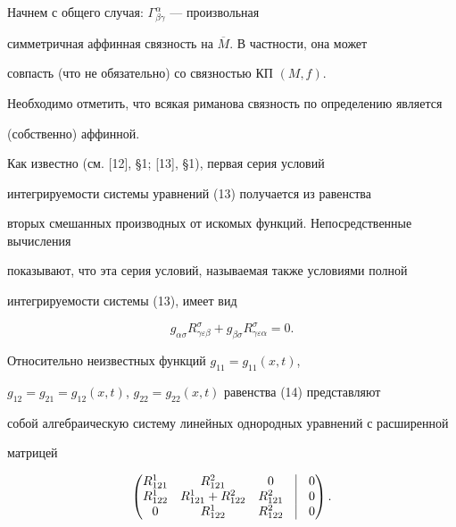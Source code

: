 Начнем с общего случая: $\Gamma^{\alpha}_{\beta \gamma} $ --- произвольная


симметричная аффинная связность на $\overline{M} $. В частности, она может


совпасть (что не обязательно) со связностью КП $(M,f) $.


Необходимо отметить, что всякая риманова связность по определению является


(собственно) аффинной.





Как известно (см. [12], \S 1; [13], \S 1), первая серия условий


интегрируемости системы уравнений (13) получается из равенства


вторых смешанных производных от искомых функций. Непосредственные вычисления


показывают, что эта серия условий, называемая также условиями полной


интегрируемости системы (13), имеет вид


\begin{equation}


g_{\alpha \sigma }R^{\sigma }_{\gamma \varepsilon \beta}


+ g_{\beta \sigma }R^{\sigma }_{\gamma \varepsilon \alpha}=0.


\end{equation}





Относительно неизвестных функций $g_{11}=g_{11}(x,t)$,


$g_{12}=g_{21}=g_{12}(x,t)$, $g_{22}=g_{22}(x,t)$ равенства (14) представляют


собой алгебраическую систему линейных однородных уравнений с расширенной


матрицей


\begin{equation}


\begin{pmatrix}


R^1_{121} & R^2_{121} & 0 & \vline & 0\\


R^1_{122} & R^1_{121}+ R^2_{122} & R^2_{121} & \vline & 0 \\


0 & R^1_{122} & R^2_{122} & \vline & 0 


\end{pmatrix}


.


\end{equation}


